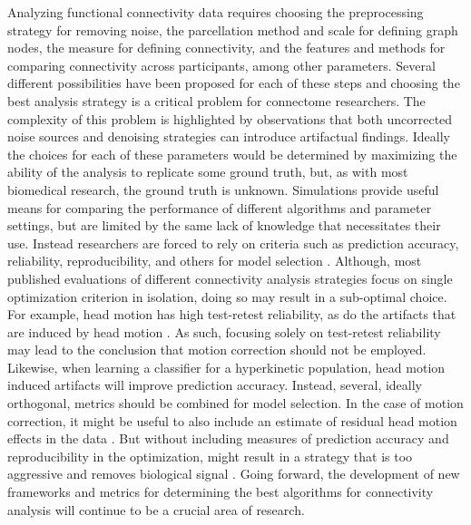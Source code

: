 Analyzing functional connectivity data requires choosing the preprocessing strategy for removing noise, the parcellation method and scale for defining graph nodes, the measure for defining connectivity, and the features and methods for comparing connectivity across participants, among other parameters. Several different possibilities have been proposed for each of these steps and choosing the best analysis strategy is a critical problem for connectome researchers. The complexity of this problem is highlighted by observations that both uncorrected noise sources \cite{Birn2012, Power2012, VanDijk2012, yan2013comprehensive, satterthwaite2012impact} and denoising strategies \cite{Murphy2009, Saad2012} can introduce artifactual findings. Ideally the choices for each of these parameters would be determined by maximizing the ability of the analysis to replicate some ground truth, but, as with most biomedical research, the ground truth is unknown. Simulations provide useful means for comparing the performance of different algorithms and parameter settings, but are limited by the same lack of knowledge that necessitates their use. Instead researchers are forced to rely on criteria such as prediction accuracy, reliability, reproducibility, and others for model selection \cite{strother2006}. Although, most published evaluations of different connectivity analysis strategies focus on single optimization criterion in isolation, doing so may result in a sub-optimal choice. For example, head motion has high test-retest reliability, as do the artifacts that are induced by head motion \cite{yan2013comprehensive}. As such, focusing solely on test-retest reliability may lead to the conclusion that motion correction should not be employed. Likewise, when learning a classifier for a hyperkinetic population, head motion induced artifacts will improve prediction accuracy\cite{satterthwaite2012improved}. Instead, several, ideally orthogonal, metrics should be combined for model selection. In the case of motion correction, it might be useful to also include an estimate of residual head motion effects in the data \cite{Power2012, VanDijk2012, yan2013comprehensive, satterthwaite2012impact}. But without including measures of prediction accuracy and reproducibility in the optimization, might result in a strategy that is too aggressive and removes biological signal  \cite{laconte2003evaluation, strother2002quantitative}. Going forward, the development of new frameworks and metrics for determining the best algorithms for connectivity analysis will continue to be a crucial area of research. 

